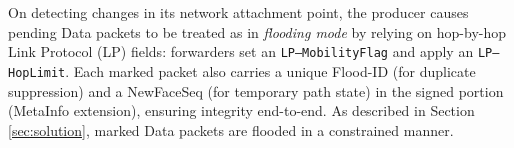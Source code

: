 \documentclass[10pt,conference]{IEEEtran}
\begin{document}
% 
% 
% 
% 
On detecting changes in its network attachment point, the producer causes pending Data packets to be treated as in \emph{flooding mode} by relying on hop-by-hop Link Protocol (LP) fields: forwarders set an \texttt{LP--MobilityFlag} and apply an \texttt{LP--HopLimit}. Each marked packet also carries a unique Flood-ID (for duplicate suppression) and a NewFaceSeq (for temporary path state) in the signed portion (MetaInfo extension), ensuring integrity end-to-end. 
% 
As described in Section \ref{sec:solution}, marked Data packets are flooded in a constrained manner.

% 
\end{document}
